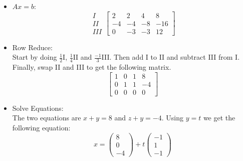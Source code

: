 \documentclass[12pt,a4paper]{exam}
\begin{document}
\begin{enumerate}
\begin{solution}
    \begin{itemize}
        \item $Ax=b$:\\
            \[ \begin{matrix}
                I\\II\\III
            \end{matrix} \left[ \begin{array}{cccc}
            2 & 2 & 4 & 8 \\
            -4 & -4 & -8 & -16 \\
            0 & -3 & -3 & 12
            \end{array} \right] \]
        \item Row Reduce:\\
            Start by doing $\frac{1}{2}$I, $\frac{1}{4}$II and $\frac{-1}{3}$III. Then add I to II and subtract III from I. Finally, swap II and III to get the following matrix.
            \[ \left[ \begin{array}{cccc}
            1 & 0 & 1 & 8 \\
            0 & 1 & 1 & -4 \\
            0 & 0 & 0 & 0
            \end{array} \right] \]
        \item Solve Equations:\\
            The two equations are $x+y=8$ and $z+y=-4$. Using $y=t$ we get the following equation:
            $$x=\left(\begin{matrix}
                8\\0\\-4
            \end{matrix} \right) + 
            t\left(\begin{matrix}
                -1\\1\\-1
            \end{matrix} \right)$$


\end{itemize}
\end{solution}
\end{enumerate}
\end{document}

